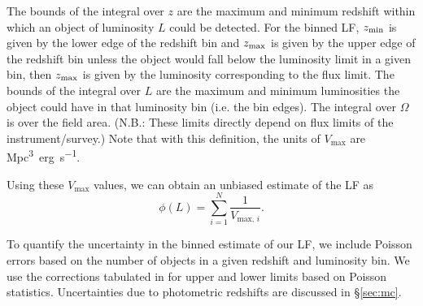 \documentclass[twocolumn, trackchanges]{aastex63}
\begin{document}

The bounds of the integral over $z$ are the maximum and minimum redshift within which an object of luminosity $L$ could be detected.
For the binned LF, $z_{\rm min}$ is given by the lower edge of the redshift bin and $z_{\rm max}$ is given by the upper edge of the redshift bin unless the object would fall below the luminosity limit in a given bin, then $z_{\rm max}$ is given by the luminosity corresponding to the flux limit.
The bounds of the integral over $L$ are the maximum and minimum luminosities the object could have in that luminosity bin (i.e. the bin edges). 
The integral over $\Omega$ is over the field area. 
(N.B.: These limits directly depend on flux limits of the instrument/survey.)
Note that with this definition, the units of $V_\mathrm{max}$ are \si{Mpc^3~erg~s^{-1}}.

Using these $V_\mathrm{max}$ values, we can obtain an unbiased estimate of the LF as
\begin{equation}
\phi(L) = \sum_{i=1}^{N}\frac{1}{V_{\mathrm{max},\,i}}.
\end{equation}

To quantify the uncertainty in the binned estimate of our LF, we include Poisson errors based on the number of objects in a given redshift and luminosity bin.
We use the corrections tabulated in \cite{gehrels_confidence_1986} for upper and lower limits based on Poisson statistics. 
Uncertainties due to photometric redshifts are discussed in \S\ref{sec:mc}. 


\end{document}
